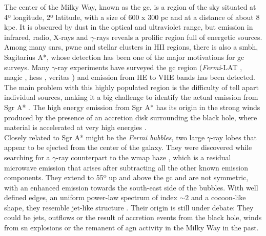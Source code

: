 \documentclass[main.tex]{subfiles}
\begin{document}
The center of the Milky Way, known as the \gls{gc}, is a region of the sky situated at 4º longitude, 2º latitude, with a size of 600 x 300 pc and at a distance of about 8 kpc. It is obscured by dust in the optical and ultraviolet range, but emission in infrared, radio, X-rays and $\gamma$-rays reveals a prolific region full of energetic sources. Among many \glspl{snr}, \gls{pwne} and stellar clusters in HII regions, there is also a \gls{smbh}, Sagitarius A*, whose detection has been one of the major motivations for \gls{gc} surveys. Many $\gamma$-ray experiments have surveyed the \gls{gc} region (\textit{Fermi}-LAT , \gls{magic} \cite{2006GCMAGIC}, \gls{hess} \cite{2018GPHESS}, \gls{veritas} \cite{2016GCveritas}) and emission from HE to VHE bands has been detected. The main problem with this highly populated region is the difficulty of tell apart individual sources, making it a big challenge to identify the actual emission from  Sgr A* \cite{2011GC}. The high energy emission from Sgr A* has its origin in the strong winds produced by the presence of an accretion disk surrounding the black hole, where material is accelerated at very high energies \cite{2007GC}.\\

Closely related to Sgr A* might be the \textit{Fermi bubbles}, two large $\gamma$-ray lobes that appear to be ejected from the center of the galaxy. They were discovered while searching for a $\gamma$-ray counterpart to the \gls{wmap} haze \cite{2010Afbubblesdiscovery}, which is a residual microwave emission that arises after subtracting all the other known emission components. They extend to 55º up and above the \gls{gc} and are not symmetric, with an enhanced emission towards the south-east side of the bubbles. With well defined edges, an uniform power-law spectrum of index $\sim 2$ and a cocoon-like shape, they resemble jet-like structure \cite{2014Fbubbles}. Their origin is still under debate: They could be jets, outflows or the result of accretion events from the black hole, winds from \gls{sn} explosions or the remanent of \gls{agn} activity in the Milky Way in the past. \\
\end{document}
